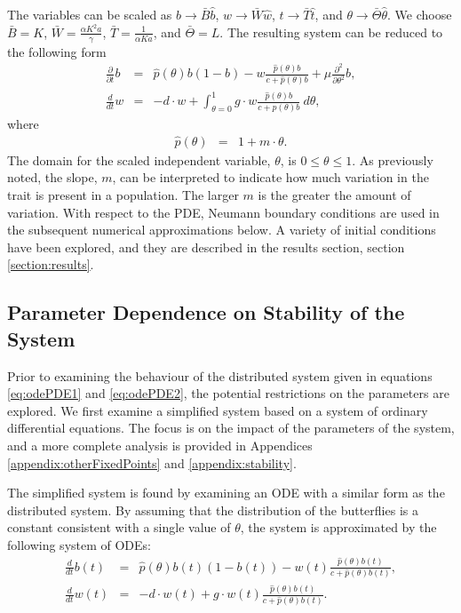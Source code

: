 \documentclass[12pt]{article}
\begin{document}
The variables can be scaled as $b\rightarrow \bar{B}\hat{b}$,
$w\rightarrow \bar{W}\hat{w}$, $t\rightarrow \bar{T}\hat{t}$, and
$\theta\rightarrow \bar{\Theta}\hat{\theta}$. We choose $\bar{B}=K$,
$\bar{W}=\frac{\alpha K^2 a}{\gamma}$, $\bar{T}=\frac{1}{\alpha K a}$,
and $\bar{\Theta}=L$. The resulting system can be reduced to the
following form
\begin{eqnarray}
  \label{eq:scaledodePDE1}
  \frac{\partial}{\partial t} b & = &
      \hat{p}(\theta) b (1 - b)
      -  w \frac{\hat{p}(\theta) b}{c+\hat{p}(\theta)b}
      + \mu \frac{\partial^2}{\partial \theta^2} b , \\
  \label{eq:scaledodePDE2}
  \frac{d}{dt} w & = & -d \cdot w +
      \int^1_{\theta=0} g \cdot w \frac{\hat{p}(\theta) b }{c + \hat{p}(\theta) b} ~ d\theta,
\end{eqnarray}
where
\begin{eqnarray}
  \hat{p}(\theta) & = & 1 + m \cdot \theta.
\end{eqnarray}
The domain for the scaled independent variable, $\theta$, is
$0\leq\theta\leq 1$. As previously noted, the slope, $m$, can be
interpreted to indicate how much variation in the trait is present in
a population. The larger $m$ is the greater the amount of variation.
With respect to the PDE, Neumann boundary conditions are used in the
subsequent numerical approximations below. A variety of initial
conditions have been explored, and they are described in the results
section, section \ref{section:results}.


\subsection{Parameter Dependence on Stability of the System}
\label{subsection:parameters}

Prior to examining the behaviour of the distributed system given in
equations \ref{eq:odePDE1} and \ref{eq:odePDE2}, the potential
restrictions on the parameters are explored. We first examine a
simplified system based on a system of ordinary differential
equations.  The focus is on the impact of the parameters of the
system, and a more complete analysis is provided in Appendices
\ref{appendix:otherFixedPoints} and \ref{appendix:stability}.

The simplified system is found by examining an ODE with a similar form
as the distributed system. By assuming that the distribution of the
butterflies is a constant consistent with a single value of $\theta$,
the system is approximated by the following system of ODEs:
\begin{eqnarray}
  \label{eq:scaledODE1}
  \frac{d}{dt} b(t) & = &
      \hat{p}(\theta) b(t) (1 - b(t))
      -  w(t) \frac{\hat{p}(\theta) b(t)}{c+\hat{p}(\theta)b(t)}, \\
  \label{eq:scaledODE2}
  \frac{d}{dt} w(t) & = & -d \cdot w(t) +
       g \cdot w(t) \frac{\hat{p}(\theta) b(t) }{c + \hat{p}(\theta) b(t)}.
\end{eqnarray}
\end{document}
